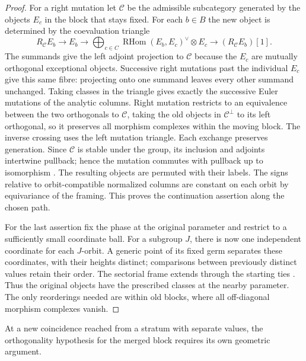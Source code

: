 \begin{proof}
For a right mutation let $\mathcal C$ be the admissible subcategory generated by the objects $E_c$ in the block that stays fixed. For each $b\in B$ the new object is determined by the coevaluation triangle
\[
 R_{\mathcal C} E_b\longrightarrow E_b\longrightarrow
   \bigoplus_{c\in C}\operatorname{RHom}(E_b,E_c)^\vee\otimes E_c
   \longrightarrow (R_{\mathcal C}E_b)[1].
\]
The summands give the left adjoint projection to $\mathcal C$ because the $E_c$ are mutually orthogonal exceptional objects. Successive right mutations past the individual $E_c$ give this same fibre: projecting onto one summand leaves every other summand unchanged. Taking classes in the triangle gives exactly the successive Euler mutations of the analytic columns. Right mutation restricts to an equivalence between the two orthogonals to $\mathcal C$, taking the old objects in $\mathcal C^\perp$ to its left orthogonal, so it preserves all morphism complexes within the moving block. The inverse crossing uses the left mutation triangle. Each exchange preserves generation. Since $\mathcal C$ is stable under the group, its inclusion and adjoints intertwine pullback; hence the mutation commutes with pullback up to isomorphism \cite[Lemma~3.24]{ESS}. The resulting objects are permuted with their labels. The signs relative to orbit-compatible normalized columns are constant on each orbit by equivariance of the framing. This proves the continuation assertion along the chosen path.

For the last assertion fix the phase at the original parameter and restrict to a sufficiently small coordinate ball. For a subgroup $J$, there is now one independent coordinate for each $J$-orbit. A generic point of its fixed germ separates these coordinates, with their heights distinct; comparisons between previously distinct values retain their order. The sectorial frame extends through the starting ties \cite[Proposition~2.5.1]{GGI}. Thus the original objects have the prescribed classes at the nearby parameter. The only reorderings needed are within old blocks, where all off-diagonal morphism complexes vanish.
\end{proof}

At a new coincidence reached from a stratum with separate values, the orthogonality hypothesis for the merged block requires its own geometric argument.
